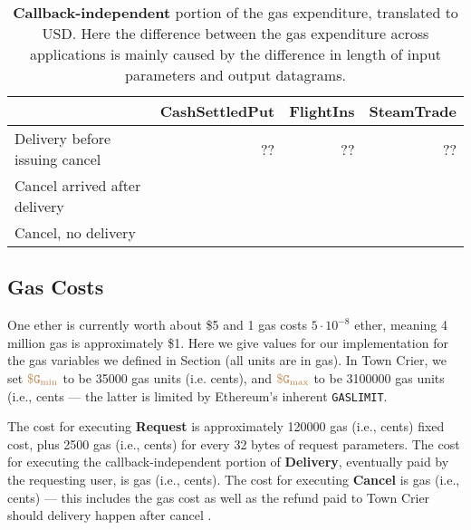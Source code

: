 \begin{table*}[ht]
\centering
\begin{tabular}{lr|r|r}
\toprule
& \multicolumn{1}{c|}{\sf CashSettledPut} &
  \multicolumn{1}{c|}{\sf FlightIns} &
  \multicolumn{1}{c}{\sf SteamTrade} \\
\midrule
Delivery before issuing cancel & ?? & ?? & ?? \\ 
Cancel arrived after delivery & & & \\ 
Cancel, no delivery & & & \\ 
\bottomrule
\end{tabular}
\caption{{\bf Callback-independent} portion of the gas expenditure, translated
to USD.  Here the difference between the gas expenditure across applications
is mainly caused 
by the difference in length of input parameters and output datagrams.
}
\label{tab:eval_gas}
\end{table*}



\subsection{Gas Costs}
One ether is currently worth about \$5 and 1 gas costs $5 \cdot 10^{-8}$ ether, meaning 4 million gas is approximately \$1.
Here we give values for our implementation for the gas variables we defined in Section  (all units are in gas).
In Town Crier, we set $\tt {\color{brown} \$G_\text{min} }$ to be 35000 gas units (i.e.   cents),
and $\tt {\color{brown} \$G_\text{max} }$ to be 3100000 gas units (i.e.,  cents --- the latter is limited by 
Ethereum's inherent {\tt GASLIMIT}.

The cost for executing {\bf Request} is approximately \num[group-separator={,}]{120000} 
gas (i.e.,  cents) 
fixed cost, 
plus \num[group-separator={,}]{2500} gas (i.e.,  cents) 
for every 32 bytes of request parameters.
The cost for executing the callback-independent portion of {\bf Delivery}, eventually paid
by the requesting user, is  gas (i.e.,  cents).
The cost for executing {\bf Cancel} is  gas (i.e.,  cents) ---
this includes 
the gas cost  
as well as the refund paid to Town 
Crier should delivery happen after cancel
.





